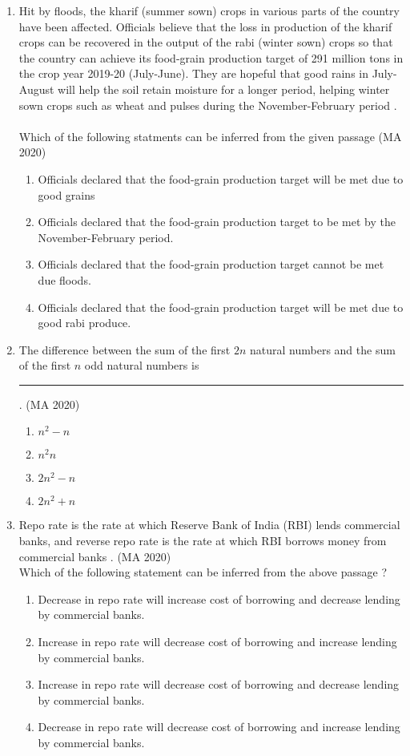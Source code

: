 \documentclass[journal,12pt,onecolumn]{IEEEtran}
\theoremstyle{remark}
\begin{document}
\begin{enumerate}
\item  	Hit by floods, the kharif (summer sown) crops in various parts of the country have been affected. Officials believe that the loss in production of the kharif crops can be recovered in the output of the rabi (winter sown) crops so that the country can achieve its food-grain production target of 291 million tons in the crop year 2019-20 (July-June). They are hopeful that good rains in July-August will help the soil retain moisture for a longer period, helping winter sown crops such as wheat and pulses during the November-February period .
\\
\\
Which of the following statments can be inferred from the given passage
\hfill{(MA 2020)}
\begin{enumerate}
\item Officials declared that the food-grain production target will be met due to good grains
\item Officials declared that the food-grain production target to be met by the November-February period.
\item Officials declared that the food-grain production target cannot be met due floods.
\item Officials declared that the food-grain production target will be met due to good rabi produce.
\end{enumerate}
 
 
 \item The difference between the sum of the first $2n$ natural numbers and the sum of the first $n$ odd natural numbers is \rule{2cm}{0.4pt}.
  \hfill{(MA 2020)}
 \begin{enumerate}
\item $n^2-n$
\item $n^2n$
\item $2n^2-n$
\item $2n^2+n$
\end{enumerate}


 \item Repo rate is the rate at which Reserve Bank of India (RBI) lends commercial banks, and reverse repo rate is the rate at which RBI borrows money from commercial banks .
 \hfill{(MA 2020)}
 \\ 
Which of the following statement can be inferred from the above passage ?

 \begin{enumerate}
\item Decrease in repo rate will increase cost of borrowing and decrease lending by commercial banks.
\item Increase in repo rate will decrease cost of borrowing and increase lending by commercial banks.
\item Increase in repo rate will decrease cost of borrowing and decrease lending by commercial banks.
\item Decrease in repo rate will decrease cost of borrowing and increase lending by commercial banks.
\end{enumerate}


\end{enumerate}
\end{document}

